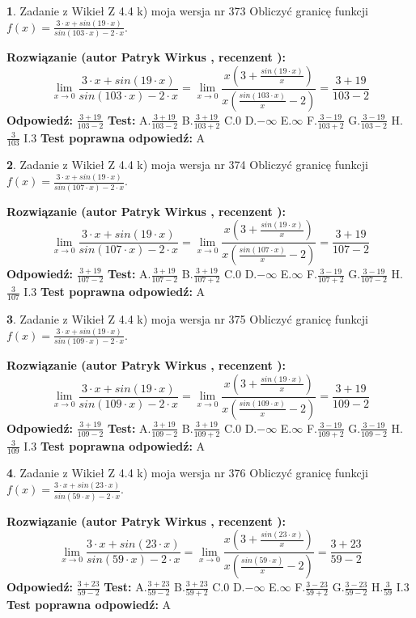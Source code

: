 \documentclass[12pt, a4paper]{article}
\theoremstyle{definition} %
\newtheorem{zad}{}
\newcommand{\zadStart}[1]{\begin{zad}#1\newline}
\newcommand{\zadStop}{\end{zad}}
\newcommand{\rozwStart}[2]{\noindent \textbf{Rozwiązanie (autor #1 , recenzent #2): }\newline}
\newcommand{\rozwStop}{\newline}
\newcommand{\odpStart}{\noindent \textbf{Odpowiedź:}\newline}
\newcommand{\odpStop}{\newline}
\newcommand{\testStart}{\noindent \textbf{Test:}\newline}
\newcommand{\testStop}{\newline}
\newcommand{\kluczStart}{\noindent \textbf{Test poprawna odpowiedź:}\newline}
\newcommand{\kluczStop}{\newline}
\begin{document}
\zadStart{Zadanie z Wikieł Z 4.4 k) moja wersja nr 373}
Obliczyć granicę funkcji $f(x)=\frac{3\cdot x +sin(19\cdot x)}{sin(103\cdot x) -2\cdot x}$.
\zadStop
\rozwStart{Patryk Wirkus}{}
$$\lim\limits_{x\to 0}\frac{3\cdot x +sin(19\cdot x)}{sin(103\cdot x) -2\cdot x}
=\lim\limits_{x\to 0}\frac{x(3+\frac{sin(19\cdot x)}{x})}{x(\frac{sin(103\cdot x)}{x}-2)}
=\frac{3+19}{103-2}$$
\rozwStop
\odpStart
$\frac{3+19}{103-2}$
\odpStop
\testStart
A.$\frac{3+19}{103-2}$
B.$\frac{3+19}{103+2}$
C.$0$
D.$-\infty$
E.$\infty$
F.$\frac{3-19}{103+2}$
G.$\frac{3-19}{103-2}$
H.$\frac{3}{103}$
I.$3$
\testStop
\kluczStart
A
\kluczStop



\zadStart{Zadanie z Wikieł Z 4.4 k) moja wersja nr 374}
Obliczyć granicę funkcji $f(x)=\frac{3\cdot x +sin(19\cdot x)}{sin(107\cdot x) -2\cdot x}$.
\zadStop
\rozwStart{Patryk Wirkus}{}
$$\lim\limits_{x\to 0}\frac{3\cdot x +sin(19\cdot x)}{sin(107\cdot x) -2\cdot x}
=\lim\limits_{x\to 0}\frac{x(3+\frac{sin(19\cdot x)}{x})}{x(\frac{sin(107\cdot x)}{x}-2)}
=\frac{3+19}{107-2}$$
\rozwStop
\odpStart
$\frac{3+19}{107-2}$
\odpStop
\testStart
A.$\frac{3+19}{107-2}$
B.$\frac{3+19}{107+2}$
C.$0$
D.$-\infty$
E.$\infty$
F.$\frac{3-19}{107+2}$
G.$\frac{3-19}{107-2}$
H.$\frac{3}{107}$
I.$3$
\testStop
\kluczStart
A
\kluczStop



\zadStart{Zadanie z Wikieł Z 4.4 k) moja wersja nr 375}
Obliczyć granicę funkcji $f(x)=\frac{3\cdot x +sin(19\cdot x)}{sin(109\cdot x) -2\cdot x}$.
\zadStop
\rozwStart{Patryk Wirkus}{}
$$\lim\limits_{x\to 0}\frac{3\cdot x +sin(19\cdot x)}{sin(109\cdot x) -2\cdot x}
=\lim\limits_{x\to 0}\frac{x(3+\frac{sin(19\cdot x)}{x})}{x(\frac{sin(109\cdot x)}{x}-2)}
=\frac{3+19}{109-2}$$
\rozwStop
\odpStart
$\frac{3+19}{109-2}$
\odpStop
\testStart
A.$\frac{3+19}{109-2}$
B.$\frac{3+19}{109+2}$
C.$0$
D.$-\infty$
E.$\infty$
F.$\frac{3-19}{109+2}$
G.$\frac{3-19}{109-2}$
H.$\frac{3}{109}$
I.$3$
\testStop
\kluczStart
A
\kluczStop



\zadStart{Zadanie z Wikieł Z 4.4 k) moja wersja nr 376}
Obliczyć granicę funkcji $f(x)=\frac{3\cdot x +sin(23\cdot x)}{sin(59\cdot x) -2\cdot x}$.
\zadStop
\rozwStart{Patryk Wirkus}{}
$$\lim\limits_{x\to 0}\frac{3\cdot x +sin(23\cdot x)}{sin(59\cdot x) -2\cdot x}
=\lim\limits_{x\to 0}\frac{x(3+\frac{sin(23\cdot x)}{x})}{x(\frac{sin(59\cdot x)}{x}-2)}
=\frac{3+23}{59-2}$$
\rozwStop
\odpStart
$\frac{3+23}{59-2}$
\odpStop
\testStart
A.$\frac{3+23}{59-2}$
B.$\frac{3+23}{59+2}$
C.$0$
D.$-\infty$
E.$\infty$
F.$\frac{3-23}{59+2}$
G.$\frac{3-23}{59-2}$
H.$\frac{3}{59}$
I.$3$
\testStop
\kluczStart
A
\kluczStop
\end{document}
